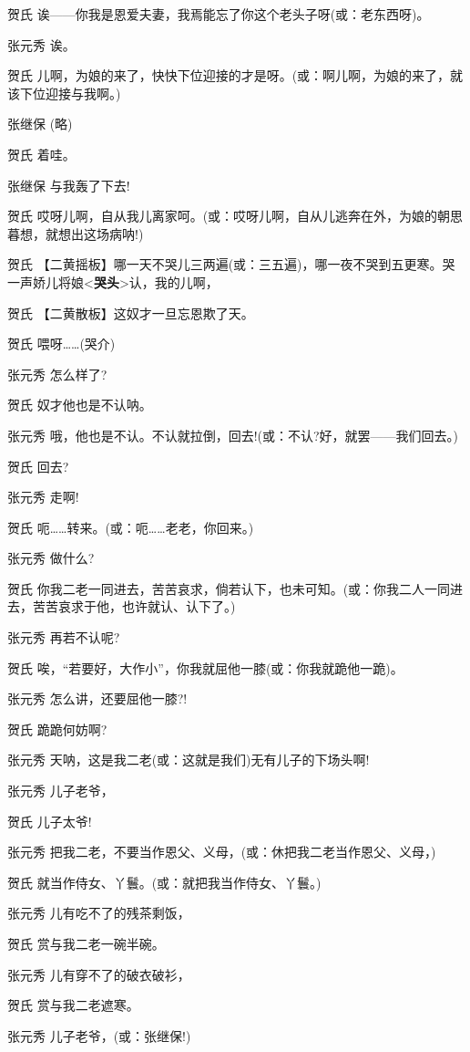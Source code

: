 贺氏 诶------你我是恩爱夫妻，我焉能忘了你这个老头子呀(或：老东西呀)。

张元秀 诶。

贺氏
儿啊，为娘的来了，快快下位迎接的才是呀。(或：啊儿啊，为娘的来了，就该下位迎接与我啊。)

张继保 (略)

贺氏 着哇。

张继保 与我轰了下去!

贺氏
哎呀儿啊，自从我儿离家呵。(或：哎呀儿啊，自从儿逃奔在外，为娘的朝思暮想，就想出这场病呐!)

贺氏
【二黄摇板】哪一天不哭儿三两遍(或：三五遍)，哪一夜不哭到五更寒。哭一声娇儿将娘\textless{}\textbf{哭头}\textgreater{}认，我的儿啊，

贺氏 【二黄散板】这奴才一旦忘恩欺了天。

贺氏 喂呀\ldots{}\ldots{}(哭介)

张元秀 怎么样了?

贺氏 奴才他也是不认呐。

张元秀
哦，他也是不认。不认就拉倒，回去!(或：不认?好，就罢------我们回去。)

贺氏 回去?

张元秀 走啊!

贺氏 呃\ldots{}\ldots{}转来。(或：呃\ldots{}\ldots{}老老，你回来。)

张元秀 做什么?

贺氏
你我二老一同进去，苦苦哀求，倘若认下，也未可知。(或：你我二人一同进去，苦苦哀求于他，也许就认、认下了。)

张元秀 再若不认呢?

贺氏 唉，``若要好，大作小''，你我就屈他一膝(或：你我就跪他一跪)。

张元秀 怎么讲，还要屈他一膝?!

贺氏 跪跪何妨啊?

张元秀 天呐，这是我二老(或：这就是我们)无有儿子的下场头啊!

张元秀 儿子老爷，

贺氏 儿子太爷!

张元秀 把我二老，不要当作恩父、义母，(或：休把我二老当作恩父、义母，)

贺氏 就当作侍女、丫鬟。(或：就把我当作侍女、丫鬟。)

张元秀 儿有吃不了的残茶剩饭，

贺氏 赏与我二老一碗半碗。

张元秀 儿有穿不了的破衣破衫，

贺氏 赏与我二老遮寒。

张元秀 儿子老爷，(或：张继保!)

